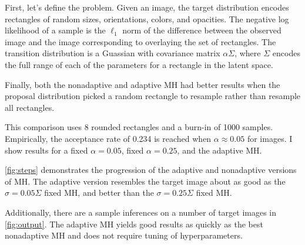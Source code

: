 \documentclass{article}
\begin{document}
First, let's define the problem. Given an image, the target distribution encodes rectangles of random sizes, orientations, colors, and opacities. The negative log likelihood of a sample is the $\ell_1$ norm of the difference between the observed image and the image corresponding to overlaying the set of rectangles. The transition distribution is a Guassian with covariance matrix $\alpha\Sigma$, where $\Sigma$ encodes the full range of each of the parameters for a rectangle in the latent space.

Finally, both the nonadaptive and adaptive MH had better results when the proposal distribution picked a random rectangle to resample rather than resample all rectangles.

This comparison uses 8 rounded rectangles and a burn-in of 1000 samples. Empirically, the acceptance rate of 0.234 is reached when $\alpha\approx0.05$ for images. I show results for a fixed $\alpha=0.05$, fixed $\alpha=0.25$, and the adaptive MH.

\cref{fig:steps} demonstrates the progression of the adaptive and nonadaptive versions of MH. The adaptive version resembles the target image about as good as the $\sigma=0.05\Sigma$ fixed MH, and better than the $\sigma=0.25\Sigma$ fixed MH.

Additionally, there are a sample inferences on a number of target images in \cref{fig:output}. The adaptive MH yields good results as quickly as the best nonadaptive MH and does not require tuning of hyperparameters.
\end{document}
